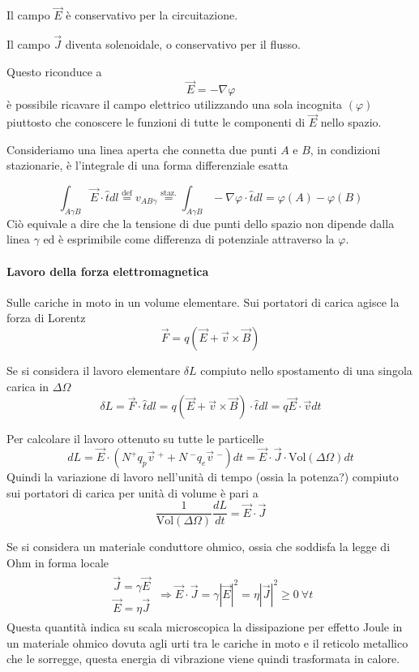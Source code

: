 Il campo $\vec{E}$ è conservativo per la circuitazione.

Il campo $\vec{J}$ diventa solenoidale, o conservativo per il flusso.

Questo riconduce a
$$
\vec{E} = -\nabla\varphi
$$
è possibile ricavare il campo elettrico utilizzando una sola incognita $(\varphi)$ piuttosto che
conoscere le funzioni di tutte le componenti di $\vec{E}$ nello spazio.

Consideriamo una linea aperta che connetta due punti $A$ e $B$, in condizioni stazionarie, è l'integrale di una forma differenziale esatta

$$
\int_{A\gamma B}\vec{E}\cdot\hat{t}dl \stackrel{\text{def}}{=} v_{AB\gamma} \stackrel{\text{staz.}}{=}
\int_{A\gamma B}-\nabla\varphi\cdot\hat{t}dl =\varphi(A)-\varphi(B)
$$
Ciò equivale a dire che la tensione di due punti dello spazio non dipende dalla linea $\gamma$ ed è
esprimibile come differenza di potenziale attraverso la $\varphi$.

\paragraph{Lavoro della forza elettromagnetica} Sulle cariche in moto in un volume elementare.
Sui portatori di carica agisce la forza di Lorentz
$$
\vec{F} = q\left(\vec{E}+\vec{v}\times\vec{B}\right)
$$

Se si considera il lavoro elementare $\delta L$ compiuto nello spostamento di una singola carica in
$\Delta\Omega$
$$
\delta L = \vec{F}\cdot\hat{t}dl = q\left(\vec{E}+\vec{v}\times\vec{B}\right)\cdot \hat{t} dl = q\vec{E}\cdot\vec{v}dt
$$

Per calcolare il lavoro ottenuto su tutte le particelle
$$
dL = \vec{E}\cdot\left(N^+q_p\vec{v}\ ^+ + N\ ^-q_e\vec{v}\ ^-\right)dt = \vec{E}\cdot\vec{J}\cdot \text{Vol}(\Delta\Omega)dt
$$
Quindi la variazione di lavoro nell'unità di tempo (ossia la potenza?) compiuto sui portatori di carica
per unità di volume è pari a
$$
\frac{1}{\text{Vol}(\Delta\Omega)}\frac{dL}{dt} = \vec{E}\cdot\vec{J} 
$$

Se si considera un materiale conduttore ohmico, ossia che soddisfa la legge di Ohm in forma locale
\begin{align*}
\begin{matrix}
\vec{J} = \gamma\vec{E} \\
\vec{E} = \eta\vec{J}
\end{matrix}\ 
\Rightarrow \vec{E}\cdot\vec{J} = \gamma\left|\vec{E}\right|^2
= \eta\left|\vec{J}\right|^2 \geq 0 \ \forall t
\end{align*}
Questa quantità indica su scala microscopica la dissipazione per effetto Joule in un materiale ohmico
dovuta agli urti tra le cariche in moto e il reticolo metallico che le sorregge, questa energia di
vibrazione viene quindi trasformata in calore.


